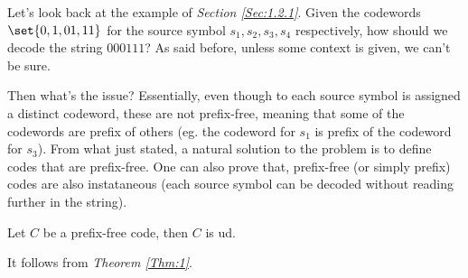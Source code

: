 \documentclass{subfiles}
\begin{document}
    Let's look back at the example of \emph{Section \ref{Sec:1.2.1}}. 
    Given the codewords \(\set{0, 1, 01, 11}\) for the source symbol \(s_{1},
    s_{2}, s_{3}, s_{4}\) respectively, how should we decode the string \(000111\)?
    As said before, unless some context is given, we can't be sure.

    Then what's the issue? 
    Essentially, even though to each source symbol is assigned a distinct codeword,
    these are not prefix-free, meaning that some of the codewords are prefix of others
    (eg. the codeword for \(s_{1}\) is prefix of the codeword for \(s_{3}\)).
    From what just stated, a natural solution to the problem is to define codes 
    that are prefix-free.
        One can also prove that, prefix-free (or simply prefix) codes are also instataneous (each 
    source symbol can be decoded without reading further in the string).
    \begin{theorem*}
        Let \(C\) be a prefix-free code, then \(C\) is \gls{ud}.
    \end{theorem*}
    \begin{proof*}
        It follows from \emph{Theorem \ref{Thm:1}}.
    \end{proof*}
\end{document}
